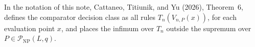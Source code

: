 In the notation of this note, Cattaneo, Titiunik, and Yu (2026), Theorem~6, defines the comparator decision class as all rules \(T_n(V_{n,P}(x))\), for each evaluation point \(x\), and places the infimum over \(T_n\) outside the supremum over \(P\in\mathcal P_{\mathrm{NP}}(L,q)\).